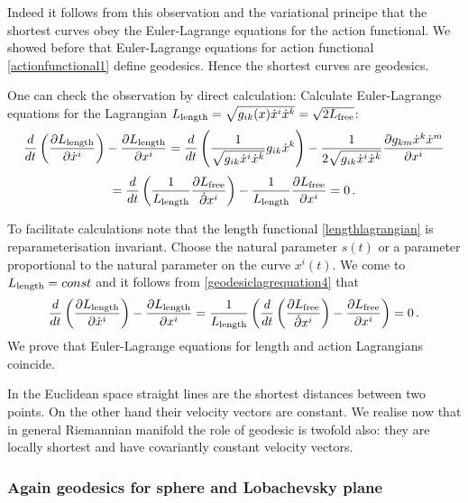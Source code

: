 \documentclass[12pt]{article}
\theoremstyle{theorem}
\numberwithin{equation}{section}
\begin{document}
{        \m

    Indeed it follows from this observation and  the variational principe that
     the shortest curves obey
     the Euler-Lagrange equations for the action functional.
     We showed before that Euler-Lagrange equations for action functional \eqref{actionfunctional1}
    define geodesics.   Hence the shortest curves are geodesics.

    \m

    One can  check the observation by direct calculation:  Calculate Euler-Lagrange equations for the Lagrangian
    $L_{\rm length}=\sqrt{g_{ik}(x)\dot x^i\dot x^k}=\sqrt {2L_{\rm free}}$:
                    $$
     {d\over dt}\left({\partial L_{\rm length}\over \partial \dot x^i}\right)-{\partial L_{\rm length}\over \partial  x^i}=
     {d\over dt}\left( {1\over \sqrt{g_{ik}\dot x^i\dot x^k}}g_{ik}\dot x^k\right)-
     {1\over 2\sqrt{g_{ik}\dot x^i\dot x^k}}{\partial g_{km}\dot x^k\dot x^m\over  \partial x^i}
                    $$
                    \begin{equation}\label{geodesiclagrequation4}
=    {d\over dt}\left( {1\over L_{\rm length}}{\partial L_{\rm free}\over  \dot {\partial} x^i}\right)-
     {1\over L_{\rm length}}{\partial L_{\rm free}\over  \partial x^i}=0\,.
                                         \end{equation}


To facilitate calculations note that the length functional \eqref{lengthlagrangian}
    is reparameterisation invariant.  Choose the natural parameter $s(t)$ or a parameter proportional
    to the natural parameter on the curve $x^i(t)$.  We come to $L_{\rm length}=const$ and
    it follows from  \eqref{geodesiclagrequation4} that
        $$
   {d\over dt}\left({\partial L_{\rm length}\over \partial \dot x^i}\right)-{\partial L_{\rm length}\over \partial  x^i}=
    {1\over L_{\rm length}}\left( {d\over dt}\left( {\partial L_{\rm free}\over  \dot {\partial} x^i}\right)-
     {\partial L_{\rm free}\over  \partial x^i}\right)=0\,.
            $$
 We prove that Euler-Lagrange equations for length and action Lagrangians coincide.\finish


\m

  In the Euclidean space straight lines are the shortest distances between two points. On the other hand
  their velocity vectors are constant.
We realise now that in general Riemannian manifold the role of geodesic is twofold also:
  they are locally shortest and have covariantly constant velocity vectors.

\m

\subsubsection {Again geodesics for sphere and Lobachevsky plane}

}
\end{document}
